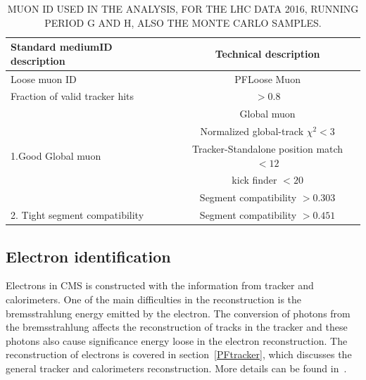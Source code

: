 \begin{table}[!tpb]
\caption{MUON ID USED IN THE ANALYSIS, FOR THE LHC DATA 2016, RUNNING PERIOD G AND H, ALSO THE MONTE CARLO SAMPLES.}\label{tbl:standardMedID}
\begin{center}
\begin{tabular}{|l|c|}   
\hline
Standard mediumID description                    &  Technical description\\\hline
Loose muon ID                               & PFLoose Muon\\\hline
Fraction of valid tracker hits           & $>0.8$ \\\hline
\multirow{5}{*}{1.Good Global muon}                      &Global muon\\\cline{2-2}
                                                                        &Normalized global-track $\chi^{2}<3$\\\cline{2-2}
                                                                        &Tracker-Standalone position match $< 12$\\\cline{2-2}
                                                                        &kick finder $< 20$ \\\cline{2-2}
                                                                        &Segment compatibility $> 0.303$ \\\hline                                                                       
\hline
2. Tight segment compatibility      & Segment compatibility $>0.451$\\\hline
\end{tabular}
\end{center}
\end{table}


\subsection{Electron identification}

Electrons in CMS is constructed with the information from tracker and calorimeters. One of the main difficulties in the reconstruction is the bremsstrahlung energy emitted by the electron. The conversion of photons from the bremsstrahlung affects the reconstruction of tracks in the tracker and these photons also cause significance energy loose in the electron reconstruction. The reconstruction of electrons is covered in section~\ref{PFtracker}, which discusses the general tracker and calorimeters reconstruction. More details can be found in~\cite{electron_reco2015}. 

